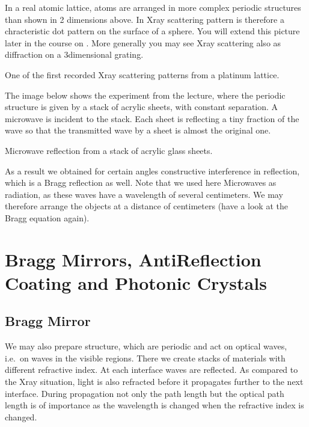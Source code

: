 \documentclass[letterpaper,10pt,english]{sphinxmanual}
\begin{document}
In a real atomic lattice, atoms are arranged in more complex periodic structures than shown in 2 dimensions above. In X\sphinxhyphen{}ray scattering pattern is therefore a chracteristic dot pattern on the surface of a sphere. You will extend this picture later in the course on . More generally you may see X\sphinxhyphen{}ray scattering also as diffraction on a 3\sphinxhyphen{}dimensional grating.






 One of the first recorded X\sphinxhyphen{}ray scattering patterns from a platinum lattice.





The image below shows the experiment from the lecture, where the periodic structure is given by a stack of acrylic sheets, with constant separation. A microwave is incident to the stack. Each sheet is reflecting a tiny fraction of the wave so that the transmitted wave by a sheet is almost the original one.






 Microwave reflection from a stack of acrylic glass sheets.





As a result we obtained for certain angles constructive interference in reflection, which is a Bragg reflection as well. Note that we used here Microwaves as radiation, as these waves have a wavelength of several centimeters. We may therefore arrange the objects at a distance of centimeters (have a look at the Bragg equation again).


\section{Bragg Mirrors, Anti\sphinxhyphen{}Reflection Coating and Photonic Crystals}
\label{\detokenize{notebooks/L11/Interference:Bragg-Mirrors,-Anti-Reflection-Coating-and-Photonic-Crystals}}

\subsection{Bragg Mirror}
\label{\detokenize{notebooks/L11/Interference:Bragg-Mirror}}
We may also prepare structure, which are periodic and act on optical waves, i.e. on waves in the visible regions. There we create stacks of materials with different refractive index. At each interface waves are reflected. As compared to the X\sphinxhyphen{}ray situation, light is also refracted before it propagates further to the next interface. During propagation not only the path length but the optical path length is of importance as the wavelength is changed when the refractive index is changed.
\end{document}
